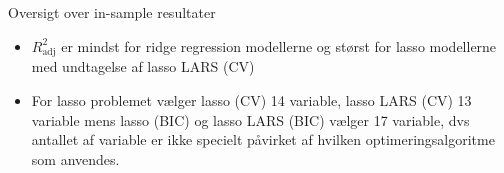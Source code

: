 \begin{frame}{Oversigt over in-sample resultater}
\begin{table}[ht] 
\centering 
{}
\caption{Inkluderingsraten af de 9 hyppigst valgte variable for de ialt 18 modeller samt beskrivelse af variablerne.}
\end{table} 
\begin{itemize}
\item \(R_\text{adj}^2\) er mindst for ridge regression modellerne og størst for lasso modellerne med undtagelse af lasso LARS (CV)
\item For lasso problemet vælger lasso (CV) 14 variable, lasso LARS (CV) 13 variable mens lasso (BIC) og lasso LARS (BIC) vælger 17 variable, dvs antallet af variable er ikke specielt påvirket af hvilken optimeringsalgoritme som anvendes. 
\end{itemize}
\end{frame}


